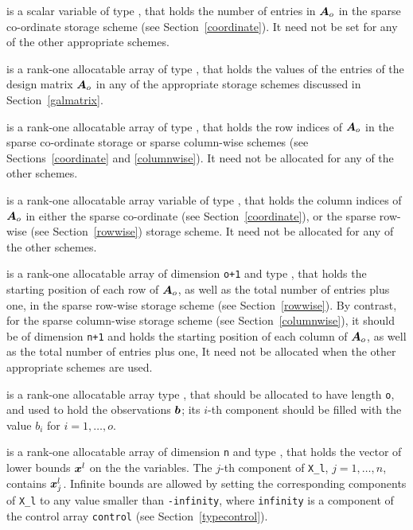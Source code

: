 \documentclass{galahad}
\begin{document}
\begin{description}
\begin{description}
 is a scalar variable of type \integer, that
holds the number of entries in ${\bm{A}}_o$
in the sparse co-ordinate storage scheme (see Section~\ref{coordinate}).
It need not be set for any of the other appropriate schemes.

 is a rank-one allocatable array of type \realdp, that
holds the values of the entries of the design matrix ${\bm{A}}_o$ in any of the
appropriate storage schemes discussed in Section~\ref{galmatrix}.

 is a rank-one allocatable array of type \integer,
that holds the row indices of ${\bm{A}}_o$ in the sparse co-ordinate storage
or sparse column-wise schemes
(see Sections~\ref{coordinate} and \ref{columnwise}).
It need not be allocated for any of the other schemes.

 is a rank-one allocatable array variable of type \integer,
that holds the column indices of ${\bm{A}}_o$ in either the sparse co-ordinate
(see Section~\ref{coordinate}), or the sparse row-wise
(see Section~\ref{rowwise}) storage scheme.
It need not be allocated for any of the other schemes.

 is a rank-one allocatable array of dimension {\tt o+1} and type
\integer, that holds the starting position of each row of ${\bm{A}}_o$,
as well as the total number of entries plus one,
in the sparse row-wise storage scheme (see Section~\ref{rowwise}).
By contrast, for the sparse column-wise storage scheme
(see Section~\ref{columnwise}), it should be of dimension {\tt n+1}
and holds the starting position of each column of ${\bm{A}}_o$,
as well as the total number of entries plus one,
It need not be allocated when the other appropriate schemes are used.

\end{description}

 is a rank-one allocatable array type \realdp, that
should be allocated to have length {\tt o}, and used to hold
the observations ${\bm{b}}$; its $i$-th component should be
filled with the value $b_{i}$ for $i = 1, \ldots , o$.

 is a rank-one allocatable array of dimension {\tt n} and type
\realdp, that holds
the vector of lower bounds ${\bm{x}}^{l}$ on the the variables.
The $j$-th component of {\tt X\_l}, $j = 1, \ldots , n$,
contains ${\bm{x}}_{j}^{l}$.
Infinite bounds are allowed by setting the corresponding
components of {\tt X\_l} to any value smaller than {\tt -infinity},
where {\tt infinity} is a component of the control array {\tt control}
(see Section~\ref{typecontrol}).


\end{description}
\end{document}
